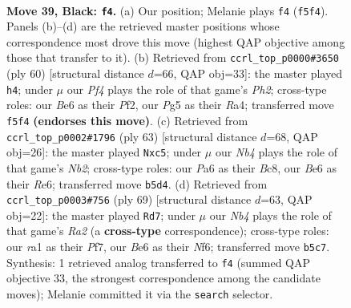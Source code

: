 \documentclass[11pt]{article}
\begin{document}
\clearpage

\begin{figure}[p]\centering
\begin{subfigure}{0.46\textwidth}\centering
\resizebox{\linewidth}{!}{%
\newchessgame
\chessboard[
  setfen={6r1/r7/p1B1bk2/Bn3ppp/8/PP3PP1/1K5P/R4RN1 b - - 0 39},
  showmover=false,
  pgfstyle=straightmove, color=movearrow, markmove={f5-f4}
]}
\caption{}
\end{subfigure}\hfill
\begin{subfigure}{0.46\textwidth}\centering
\resizebox{\linewidth}{!}{%
\newchessgame
\chessboard[
  setfen={2r3k1/5p1p/p1r3p1/2B1b3/RP1p2P1/8/4PP1P/3R1K2 w - - 3 31},
  showmover=false,
  pgfstyle=straightmove, color=movearrow, markmove={h2-h4}
]}
\caption{}
\end{subfigure}
\\[4pt]
\begin{subfigure}{0.46\textwidth}\centering
\resizebox{\linewidth}{!}{%
\newchessgame
\chessboard[
  setfen={r1b5/pn3pk1/B3r2p/2Pp4/1N2p3/5P2/P1R3P1/5RK1 b - - 1 32},
  showmover=false,
  pgfstyle=straightmove, color=movearrow, markmove={b7-c5}
]}
\caption{}
\end{subfigure}\hfill
\begin{subfigure}{0.46\textwidth}\centering
\resizebox{\linewidth}{!}{%
\newchessgame
\chessboard[
  setfen={8/r4pk1/1p3np1/1Nb4p/8/4P1PP/1R1RBPK1/r7 b - - 17 35},
  showmover=false,
  pgfstyle=straightmove, color=movearrow, markmove={a7-d7}
]}
\caption{}
\end{subfigure}
\caption{\textbf{Move 39, Black: \texttt{f4}.} (a) Our position; Melanie plays \texttt{f4} (\texttt{f5f4}). Panels (b)--(d) are the retrieved master positions whose correspondence most drove this move (highest QAP objective among those that transfer to it). (b) Retrieved from \texttt{ccrl\_top\_p0000\#3650} (ply 60) [structural distance $d$=66, QAP obj=33]: the master played \texttt{h4}; under $\mu$ our \emph{Pf4} plays the role of that game's \emph{Ph2}; cross-type roles: our \emph{B}e6 as their \emph{P}f2, our \emph{P}g5 as their \emph{R}a4; transferred move \texttt{f5f4} \textbf{(endorses this move)}. (c) Retrieved from \texttt{ccrl\_top\_p0002\#1796} (ply 63) [structural distance $d$=68, QAP obj=26]: the master played \texttt{Nxc5}; under $\mu$ our \emph{Nb4} plays the role of that game's \emph{Nb2}; cross-type roles: our \emph{P}a6 as their \emph{B}c8, our \emph{B}e6 as their \emph{R}e6; transferred move \texttt{b5d4}. (d) Retrieved from \texttt{ccrl\_top\_p0003\#756} (ply 69) [structural distance $d$=63, QAP obj=22]: the master played \texttt{Rd7}; under $\mu$ our \emph{Nb4} plays the role of that game's \emph{Ra2} (a \textbf{cross-type} correspondence); cross-type roles: our \emph{r}a1 as their \emph{P}f7, our \emph{B}e6 as their \emph{N}f6; transferred move \texttt{b5c7}. Synthesis: 1 retrieved analog transferred to \texttt{f4} (summed QAP objective 33, the strongest correspondence among the candidate moves); Melanie committed it via the \texttt{search} selector.}
\label{fig:thought-m77}
\end{figure}
\end{document}
